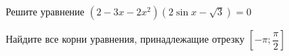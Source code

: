 \begin{ex}
	\begin{condition}
		\begin{enumcols}[label=\asbuk*)]
			\item Решите уравнение \( (2 - 3x -2x^2)(2\sin x -\sqrt{3}) = 0 \)
			\item Найдите все корни уравнения, принадлежащие отрезку \(\left[-\pi;\dfrac{\pi}{2}\right]  \)
		\end{enumcols}
	\end{condition}
\end{ex}